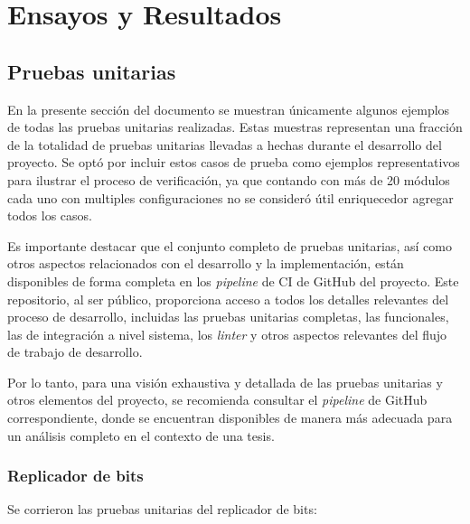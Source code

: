 \chapter{Ensayos y Resultados}\label{Chapter4}


\section{Pruebas unitarias}

En la presente sección del documento se muestran únicamente algunos ejemplos de
todas las pruebas unitarias realizadas. Estas muestras representan una fracción
de la totalidad de pruebas unitarias llevadas a hechas durante el desarrollo del
proyecto. Se optó por incluir estos casos de prueba como ejemplos representativos
para ilustrar el proceso de verificación, ya que contando con más de 20 módulos
cada uno con multiples configuraciones no se consideró útil enriquecedor agregar
todos los casos.

Es importante destacar que el conjunto completo de pruebas unitarias, así como
otros aspectos relacionados con el desarrollo y la implementación, están
disponibles de forma completa en los \textit{pipeline} de CI de GitHub del
proyecto. Este repositorio, al ser público, proporciona acceso a todos los
detalles relevantes del proceso de desarrollo, incluidas las pruebas unitarias
completas, las funcionales, las de integración a nivel sistema, los \textit{linter}
y otros aspectos relevantes del flujo de trabajo de desarrollo.

Por lo tanto, para una visión exhaustiva y detallada de las pruebas unitarias
y otros elementos del proyecto, se recomienda consultar el \textit{pipeline} de
GitHub correspondiente, donde se encuentran disponibles de manera más adecuada
para un análisis completo en el contexto de una tesis.


\subsection{Replicador de bits}

  Se corrieron las pruebas unitarias del replicador de bits: 

